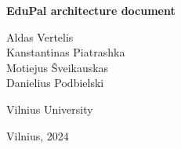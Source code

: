 \documentclass[a4paper,12pt]{article}
\begin{document}
\begin{titlepage}
    \centering
    \vspace*{1in}
    
    {\Huge\bfseries EduPal architecture document \par}
    \vspace{1.5in}
    
    {\Large Aldas Vertelis\\Kanstantinas Piatrashka\\Motiejus Šveikauskas\\Danielius Podbielski \par}
    \vfill
    
    {\large Vilnius University \par}
    \vfill
    
    {\large Vilnius, 2024\par}
\end{titlepage}

\tableofcontents
\newpage












\listoffigures
\end{document}
